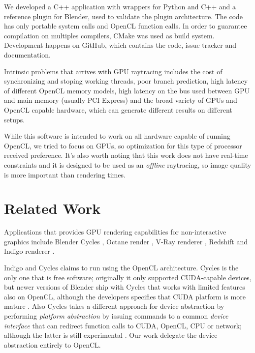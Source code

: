 \documentclass[a4paper]{sbgames}               %
\begin{document}
We developed a C++ application with wrappers for
Python %
and C++ and a reference plugin for Blender, used to validate the
plugin architecture. The code has only portable system calls and
OpenCL function calls. In order to guarantee compilation on multiples
compilers, CMake was used as build system. Development happens on
GitHub, which contains the code, issue tracker and
documentation\cite{RenderGirl}.

Intrinsic problems that arrives with GPU raytracing includes the cost
of synchronizing and stoping working threads, poor branch prediction,
high latency of different OpenCL memory models, high latency on the
bus used between GPU and main memory (usually PCI Express) and the
broad variety of GPUs and OpenCL capable hardware, which can generate
different results on different setups.

While this software is intended to work on all hardware capable of
running OpenCL, we tried to focus on GPUs, so optimization for this
type of processor received preference. It's also worth noting that
this work does not have real-time constraints and it is designed to be
used as an \emph{offline} raytracing, so image quality is more
important than rendering times.

\section{Related Work}
\label{sec:related-work}

Applications that provides GPU rendering capabilities for
non-interactive graphics include Blender Cycles\cite{Cycles} , Octane
render \cite{Octane}, V-Ray renderer \cite{VRAY}, Redshift
\cite{Redshift} and Indigo renderer \cite{Indigo}.

Indigo and Cycles claims to run using the OpenCL architecture. Cycles
is the only one that is free software; originally it only supported
CUDA-capable devices, but newer versions of Blender ship with Cycles
that works with limited features also on OpenCL, although the
developers specifies that CUDA platform is more mature \cite{Cycles}.
Also Cycles takes a different approach for device abstraction by
performing \emph{platform abstraction} by issuing commands to a common
\emph{device interface} that can redirect function calls to CUDA,
OpenCL, CPU or network; although the latter is still experimental
\cite{CyclesDevel}. Our work delegate the device abstraction entirely
to OpenCL.
\end{document}

